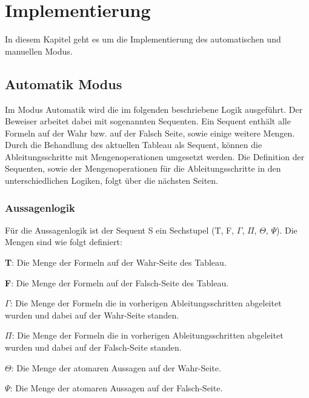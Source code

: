 
\chapter{\label{sec:implementierung}Implementierung}
In diesem Kapitel geht es um die Implementierung des automatischen und manuellen Modus.

\section{Automatik Modus}
Im Modus Automatik wird die im folgenden beschriebene Logik ausgeführt. Der Beweiser arbeitet dabei mit sogenannten Sequenten. Ein Sequent enthält alle Formeln auf der Wahr bzw. auf der Falsch Seite, sowie einige weitere Mengen. Durch die Behandlung des aktuellen Tableau als Sequent, können die Ableitungsschritte mit Mengenoperationen umgesetzt werden. Die Definition der Sequenten, sowie der Mengenoperationen für die Ableitungsschritte in den unterschiedlichen Logiken, folgt über die nächsten Seiten.

\subsection{Aussagenlogik}
Für die Aussagenlogik ist der Sequent S ein Sechstupel (T, F, $\Gamma$, $\Pi$, $\Theta$, $\Psi$). Die Mengen sind wie folgt definiert:
\begin{description}
\item \textbf{T}: Die Menge der Formeln auf der Wahr-Seite des Tableau.

\item \textbf{F}: Die Menge der Formeln auf der Falsch-Seite des Tableau.

\item \textbf{$\Gamma$}: Die Menge der Formeln die in vorherigen Ableitungsschritten abgeleitet wurden und dabei auf der Wahr-Seite standen.

\item \textbf{$\Pi$}: Die Menge der Formeln die in vorherigen Ableitungsschritten abgeleitet wurden und dabei auf der Falsch-Seite standen.

\item \textbf{$\Theta$}: Die Menge der atomaren Aussagen auf der Wahr-Seite.

\item \textbf{$\Psi$}: Die Menge der atomaren Aussagen auf der Falsch-Seite.
\end{description}

